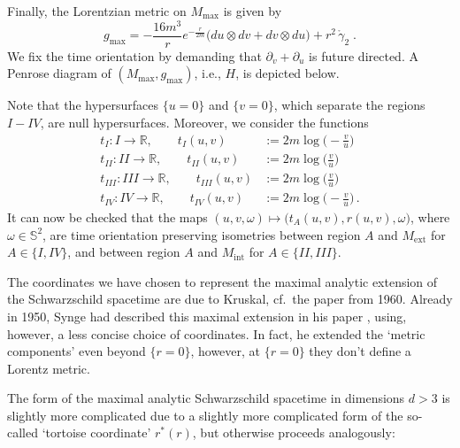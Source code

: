 \documentclass[reqno]{article}
\newcommand{\R}{\mathbb{R}}
\newcommand{\Mint}{M_{\mathrm{int}}}
\newcommand{\Mext}{M_{\mathrm{ext}}}
\newcommand{\Mmax}{M_{\mathrm{max}}}
\newcommand{\gmax}{g_{\mathrm{max}}}
\begin{document}
Finally, the Lorentzian metric on $\Mmax$ is given by
\begin{equation*}
\gmax = -\frac{16m^3}{r} e^{-\frac{r}{2m}} \big(du \otimes dv + dv \otimes du \big) + r^2 \, \mathring{\gamma}_2 \;.
\end{equation*}
We fix the time orientation by demanding that $\partial_v + \partial_u$ is future directed. A Penrose diagram of $(\Mmax, \gmax)$, i.e., $H$, is depicted below.
\begin{center}
\def\svgwidth{4cm}

\end{center}
Note that the hypersurfaces $\{u=0\}$ and $\{v=0\}$, which separate the regions $I - IV$, are null hypersurfaces. Moreover, we consider the functions
\begin{equation}
\label{TFunction}
\begin{split}
t_I : I \to \R, \qquad t_I(u,v) &:= 2m \log \big(-\frac{v}{u}\big) \\
t_{II} : II \to \R, \qquad t_{II}(u,v) &:= 2m \log \big(\frac{v}{u}\big) \\
t_{III} : III \to \R, \qquad t_{III}(u,v) &:= 2m \log \big(\frac{v}{u}\big) \\
t_{IV }: IV \to \R, \qquad t_{IV}(u,v) &:= 2m \log \big(-\frac{v}{u}\big) \,.
\end{split}
\end{equation}
It can now be checked that the maps $(u,v, \omega) \mapsto \big(t_{A}(u,v), r(u,v), \omega\big)$, where $\omega \in \mathbb{S}^2$, are time orientation preserving isometries between region $A$ and $\Mext$ for $A \in \{I, IV\}$, and between region $A$ and $\Mint$ for $A \in \{II, III\}$.

The coordinates we have chosen to represent the maximal analytic extension of the Schwarzschild spacetime are due to Kruskal, cf.\ the paper \cite{Krus60} from 1960. Already in 1950, Synge had described this maximal extension in his paper \cite{Synge50}, using, however, a less concise choice of coordinates. In fact, he extended the `metric components' even beyond $\{r=0\}$, however, at $\{r=0\}$ they don't define a Lorentz metric.
\vspace*{3mm}

The form of the maximal analytic Schwarzschild spacetime in dimensions $d >3$ is slightly more complicated due to a slightly more complicated form of the so-called `tortoise coordinate' $r^*(r)$, but otherwise proceeds analogously:
\end{document}
